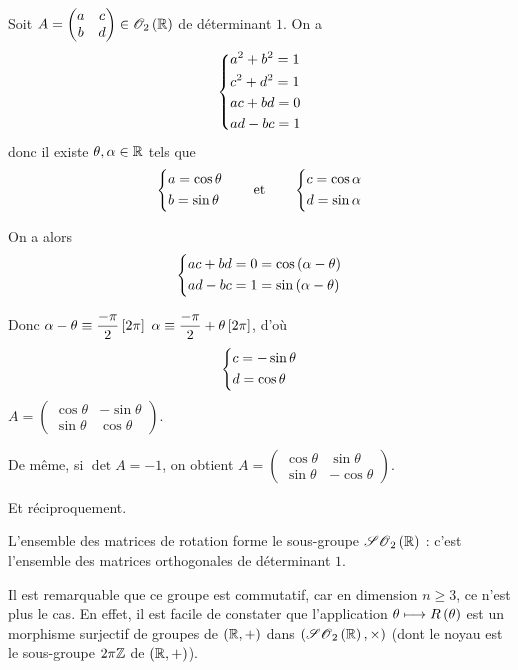 \begin{dem}~\\
Soit \(A=\begin{pmatrix}
a & c \\
b & d
\end{pmatrix}\in\Orth{2}[\R]\) de déterminant \(1\). On a \[\begin{dcases}
a^2+b^2=1 \\
c^2+d^2=1 \\
ac+bd=0 \\
ad-bc=1
\end{dcases}\] donc il existe \(\theta,\alpha\in\mathbb{R}\) tels que \[\begin{dcases}
a=\cos\theta \\
b=\sin\theta
\end{dcases}\qquad\text{et}\qquad\begin{dcases}
c=\cos\alpha \\
d=\sin\alpha
\end{dcases}\]

On a alors \[\begin{dcases}
ac+bd=0=\cos\left(\alpha-\theta\right) \\
ad-bc=1=\sin\left(\alpha-\theta\right)
\end{dcases}\]

Donc \(\alpha-\theta\equiv\dfrac{-\pi}{2}\left[2\pi\right]\) \ie \(\alpha\equiv\dfrac{-\pi}{2}+\theta\left[2\pi\right]\), d'où \[\begin{dcases}
c=-\sin\theta \\
d=\cos\theta
\end{dcases}\] \ie \(A=\begin{pmatrix}
\cos\theta & -\sin\theta \\
\sin\theta & \cos\theta
\end{pmatrix}\).

De même, si \(\det A=-1\), on obtient \(A=\begin{pmatrix}
\cos\theta & \sin\theta \\
\sin\theta & -\cos\theta
\end{pmatrix}\).

Et réciproquement.
\end{dem}

L'ensemble des matrices de rotation forme le sous-groupe \(\SO{2}[\R]\) : c'est l'ensemble des matrices orthogonales de déterminant \(1\).

Il est remarquable que ce groupe est commutatif, car en dimension \(n\geq3\), ce n'est plus le cas. En effet, il est facile de constater que l'application \(\theta\longmapsto R\left(\theta\right)\) est un morphisme surjectif de groupes de \(\groupe{\R}\) dans \(\groupe{\SO{2}[\R]}[\times]\) (dont le noyau est le sous-groupe \(2\pi\mathbb{Z}\) de \(\groupe{\R}\)).

